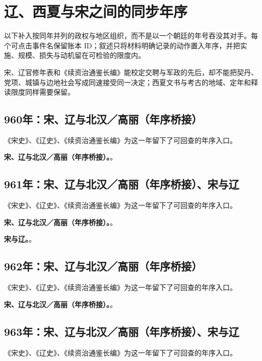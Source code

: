 \section{辽、西夏与宋之间的同步年序}
以下补入按同年并列的政权与地区组织，而不是以一个朝廷的年号吞没其对手。每个可点击事件名保留账本 ID；叙述只将材料明确记录的动作置入年序，并把实施、规模、损失与动机留在可检验的限度内。

宋、辽官修年表和《续资治通鉴长编》能校定交聘与军政的先后，却不能把契丹、党项、城镇与边地社会写成同速接受同一决定；西夏文书与考古的地域、定年和释读限度同样需要保留。

\subsection{960年：宋、辽与北汉／高丽（年序桥接）}
《宋史》、《辽史》、《续资治通鉴长编》为这一年留下了可回查的年序入口。

\noindent\textbf{宋、辽与北汉／高丽（年序桥接）。}。

\subsection{961年：宋、辽与北汉／高丽（年序桥接）、宋与辽}
《宋史》、《辽史》、《续资治通鉴长编》为这一年留下了可回查的年序入口。

\noindent\textbf{宋、辽与北汉／高丽（年序桥接）。}。

\noindent\textbf{宋与辽。}。

\subsection{962年：宋、辽与北汉／高丽（年序桥接）}
《宋史》、《辽史》、《续资治通鉴长编》为这一年留下了可回查的年序入口。

\noindent\textbf{宋、辽与北汉／高丽（年序桥接）。}。

\subsection{963年：宋、辽与北汉／高丽（年序桥接）、宋与辽}
《宋史》、《辽史》、《续资治通鉴长编》为这一年留下了可回查的年序入口。

